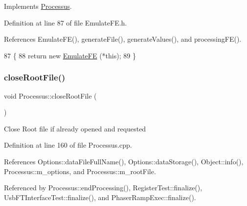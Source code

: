Implements \hyperlink{classProcessus_aca8856f6d6d7b7e1fe941f298dcbb502}{Processus}.



Definition at line 87 of file Emulate\+F\+E.\+h.



References Emulate\+F\+E(), generate\+File(), generate\+Values(), and processing\+F\+E().


\begin{DoxyCode}
87                     \{
88     \textcolor{keywordflow}{return} \textcolor{keyword}{new} \hyperlink{classEmulateFE_ac6242fca0d5c30477153d1d33d5f990d}{EmulateFE} (*\textcolor{keyword}{this});
89   \}
\end{DoxyCode}
\mbox{\label{classProcessus_a2f3c41e99da4c738ea3d8f7b0d20a665}} 
\subsubsection{\texorpdfstring{close\+Root\+File()}{closeRootFile()}}
{\footnotesize\ttfamily void Processus\+::close\+Root\+File (\begin{DoxyParamCaption}{ }\end{DoxyParamCaption})\hspace{0.3cm}{\ttfamily [inherited]}}

Close Root file if already opened and requested 

Definition at line 160 of file Processus.\+cpp.



References Options\+::data\+File\+Full\+Name(), Options\+::data\+Storage(), Object\+::info(), Processus\+::m\+\_\+options, and Processus\+::m\+\_\+root\+File.



Referenced by Processus\+::end\+Processing(), Register\+Test\+::finalize(), Usb\+F\+T\+Interface\+Test\+::finalize(), and Phaser\+Ramp\+Exec\+::finalize().


